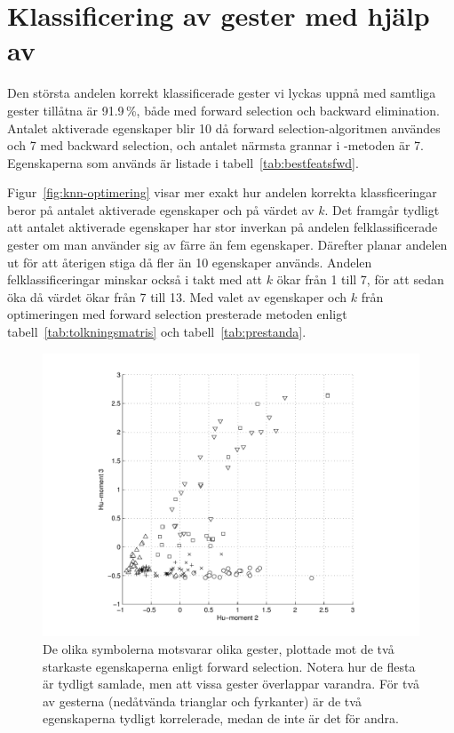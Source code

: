 \documentclass[../rapport_MVEX01-11-05]{subfiles}
\begin{document}
\section{Klassificering av gester med hjälp av \knn}
Den största andelen korrekt klassificerade gester vi lyckas uppnå
med samtliga gester tillåtna är 91.9\,\%, både med forward selection
och backward elimination. Antalet aktiverade
egenskaper blir 10 då forward selection-algoritmen användes och 7 med
backward selection, och antalet närmsta grannar i \knn-metoden är 7. Egenskaperna som
används är listade i
tabell~\vref{tab:bestfeatsfwd}.

Figur~\vref{fig:knn-optimering} visar mer
exakt hur andelen korrekta
klassficeringar beror på antalet aktiverade egenskaper och på värdet av $k$.
Det framgår tydligt att antalet aktiverade egenskaper har stor
inverkan på andelen felklassificerade gester
om man använder sig av färre än
fem egenskaper. Därefter planar andelen ut för att återigen stiga då
fler än 10 egenskaper används. Andelen felklassificeringar
minskar också i takt med att $k$ ökar från 1 till 7, för att sedan
öka då värdet ökar från 7 till 13. Med valet av egenskaper och $k$ från
optimeringen med forward selection presterade metoden enligt
tabell~\vref{tab:tolkningsmatris} och tabell~\vref{tab:prestanda}.

\begin{figure}[tbp]
  \centering
  \includegraphics[width=\textwidth,trim=2cm 0.5cm 2cm 0,clip=true]{bilder/feats-10+11}
  \caption{De olika symbolerna motsvarar olika gester, plottade mot de två starkaste egenskaperna
  enligt forward selection. Notera hur de flesta är tydligt samlade, men att
	vissa gester överlappar varandra. För två av gesterna (nedåtvända trianglar och fyrkanter) 
	är de två egenskaperna tydligt korrelerade, medan de inte är det för andra.}
  \label{fig:feats1011}
\end{figure}
\end{document}
